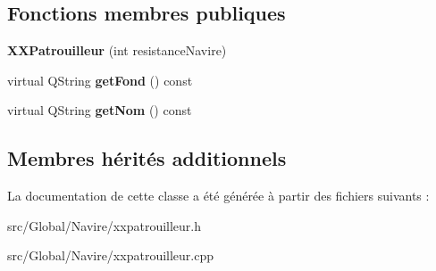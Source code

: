 \subsection*{Fonctions membres publiques}
\begin{DoxyCompactItemize}
\item 
{\bfseries X\+X\+Patrouilleur} (int resistance\+Navire)\hypertarget{class_x_x_patrouilleur_afc797bb89569d3968b50711c30cb71ec}{}\label{class_x_x_patrouilleur_afc797bb89569d3968b50711c30cb71ec}

\item 
virtual Q\+String {\bfseries get\+Fond} () const \hypertarget{class_x_x_patrouilleur_ab8e7c57135c9c80352bf82fc8eddc953}{}\label{class_x_x_patrouilleur_ab8e7c57135c9c80352bf82fc8eddc953}

\item 
virtual Q\+String {\bfseries get\+Nom} () const \hypertarget{class_x_x_patrouilleur_a142ce373db8bb40a3291e32ed3528766}{}\label{class_x_x_patrouilleur_a142ce373db8bb40a3291e32ed3528766}

\end{DoxyCompactItemize}
\subsection*{Membres hérités additionnels}


La documentation de cette classe a été générée à partir des fichiers suivants \+:\begin{DoxyCompactItemize}
\item 
src/\+Global/\+Navire/xxpatrouilleur.\+h\item 
src/\+Global/\+Navire/xxpatrouilleur.\+cpp\end{DoxyCompactItemize}
